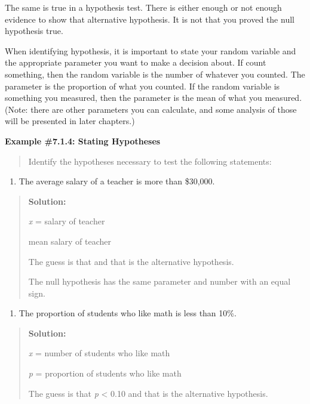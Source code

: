 \documentclass[]{book}
\providecommand{\tightlist}{%
  \setlength{\itemsep}{0pt}\setlength{\parskip}{0pt}}
\begin{document}
The same is true in a hypothesis test. There is either enough or not
enough evidence to show that alternative hypothesis. It is not that you
proved the null hypothesis true.

When identifying hypothesis, it is important to state your random
variable and the appropriate parameter you want to make a decision
about. If count something, then the random variable is the number of
whatever you counted. The parameter is the proportion of what you
counted. If the random variable is something you measured, then the
parameter is the mean of what you measured. (Note: there are other
parameters you can calculate, and some analysis of those will be
presented in later chapters.)

\textbf{Example \#7.1.4: Stating Hypotheses}

\begin{quote}
Identify the hypotheses necessary to test the following statements:
\end{quote}

\begin{enumerate}
\def\labelenumi{\alph{enumi}.}
\tightlist
\item
  The average salary of a teacher is more than \$30,000.
\end{enumerate}

\begin{quote}
\textbf{Solution:}

\emph{x} = salary of teacher

mean salary of teacher

The guess is that and that is the alternative hypothesis.

The null hypothesis has the same parameter and number with an equal
sign.
\end{quote}

\begin{enumerate}
\def\labelenumi{\alph{enumi}.}
\setcounter{enumi}{1}
\tightlist
\item
  The proportion of students who like math is less than 10\%.
\end{enumerate}

\begin{quote}
\textbf{Solution:}

\emph{x} = number of students who like math

\emph{p} = proportion of students who like math

The guess is that \emph{p} \textless{} 0.10 and that is the alternative hypothesis.
\end{quote}
\end{document}
